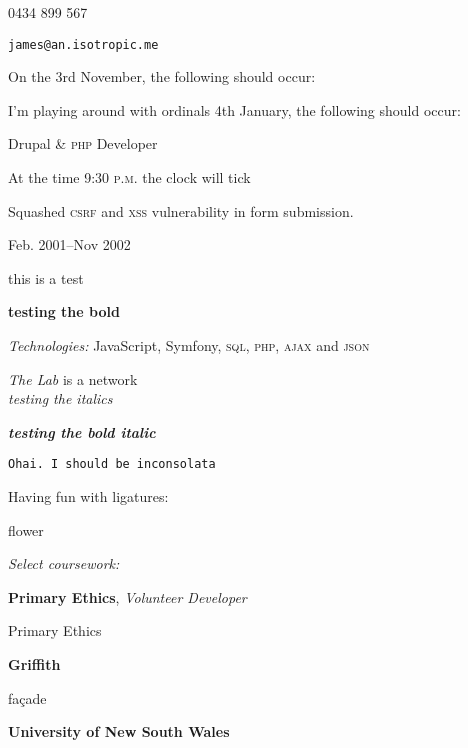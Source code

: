 \documentclass[12pt,a4paper]{article}
\begin{document}
0434 899 567

\texttt{james@an.isotropic.me}

On the {
3rd
}November, the following should occur:


I'm playing around with ordinals {
4th
}January, the following should occur:

Drupal \& \textsc{php} Developer

At the time 9:30 \textsc{p.m.} the clock will tick

Squashed \textsc{csrf} and \textsc{xss} vulnerability in form submission.

Feb. 2001--Nov 2002

this is a test

\textbf{testing the bold} 


\textit{Technologies:} JavaScript, Symfony, \textsc{sql}, \textsc{php}, \textsc{ajax} and \textsc{json}

\emph{The Lab} is a network 
\\

\emph{testing the italics}

\textbf{\emph{testing the bold italic}}

\texttt{Ohai. I should be inconsolata}

Having fun with ligatures:

flower

\textit{Select coursework:}

\textbf{Primary Ethics}, \textit{Volunteer Developer}

{Primary Ethics}


\textbf{Griffith}

fa\c{c}ade

\textbf{University of New South Wales}
\end{document}
